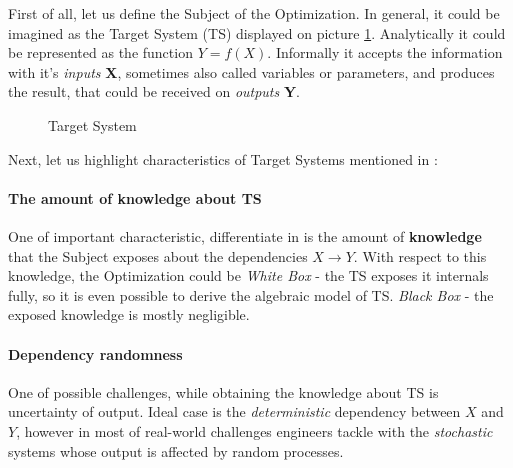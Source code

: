 First of all, let us define the Subject of the Optimization. In general, it could be imagined as the Target System (TS) displayed on picture \ref{bg:pic:Target System}. Analytically it could be represented as the function $Y = f(X)$. Informally it accepts the information with it's \textit{inputs} \textbf{X}, sometimes also called variables or parameters, and produces the result, that could be received on \textit{outputs} \textbf{Y}.

\begin{figure}
	\centering
	
	\caption{Target System}
	\label{bg:pic:Target System}
\end{figure}


Next, let us highlight characteristics of Target Systems mentioned in \cite{biegler2004retrospective,figueira2014hybrid,amaran2016simulation}:
\paragraph{The amount of knowledge about TS} One of important characteristic, differentiate in is the amount of \textbf{knowledge} that the Subject exposes about the dependencies $X \rightarrow Y$. With respect to this knowledge, the Optimization could be \textit{White Box} - the TS exposes it internals fully, so it is even possible to derive the algebraic model of TS.
\textit{Black Box} - the exposed knowledge is mostly negligible. 




\paragraph{Dependency randomness} One of possible challenges, while obtaining the knowledge about TS is uncertainty of output. Ideal case is the \textit{deterministic} dependency between $X$ and $Y$, however in most of real-world challenges engineers tackle with the \textit{stochastic} systems whose output is affected by random processes. 
 

